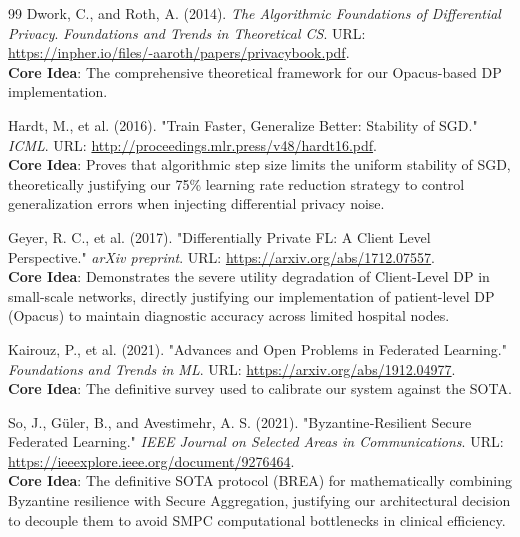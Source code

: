 \documentclass[10pt, a4paper, twocolumn]{article}
\begin{document}
\begin{thebibliography}{99}
 Dwork, C., and Roth, A. (2014). \textit{The Algorithmic Foundations of Differential Privacy}. \textit{Foundations and Trends in Theoretical CS}. URL: \url{https://inpher.io/files/-aaroth/papers/privacybook.pdf}. \\
\textbf{Core Idea}: The comprehensive theoretical framework for our Opacus-based DP implementation.

 Hardt, M., et al. (2016). "Train Faster, Generalize Better: Stability of SGD." \textit{ICML}. URL: \url{http://proceedings.mlr.press/v48/hardt16.pdf}. \\
\textbf{Core Idea}: Proves that algorithmic step size limits the uniform stability of SGD, theoretically justifying our 75\% learning rate reduction strategy to control generalization errors when injecting differential privacy noise.

 Geyer, R. C., et al. (2017). "Differentially Private FL: A Client Level Perspective." \textit{arXiv preprint}. URL: \url{https://arxiv.org/abs/1712.07557}. \\
\textbf{Core Idea}: Demonstrates the severe utility degradation of Client-Level DP in small-scale networks, directly justifying our implementation of patient-level DP (Opacus) to maintain diagnostic accuracy across limited hospital nodes.

 Kairouz, P., et al. (2021). "Advances and Open Problems in Federated Learning." \textit{Foundations and Trends in ML}. URL: \url{https://arxiv.org/abs/1912.04977}. \\
\textbf{Core Idea}: The definitive survey used to calibrate our system against the SOTA.

 So, J., Güler, B., and Avestimehr, A. S. (2021). "Byzantine‑Resilient Secure Federated Learning." \textit{IEEE Journal on Selected Areas in Communications}. URL: \url{https://ieeexplore.ieee.org/document/9276464}. \\
\textbf{Core Idea}: The definitive SOTA protocol (BREA) for mathematically combining Byzantine resilience with Secure Aggregation, justifying our architectural decision to decouple them to avoid SMPC computational bottlenecks in clinical efficiency.

\end{thebibliography}
\end{document}
